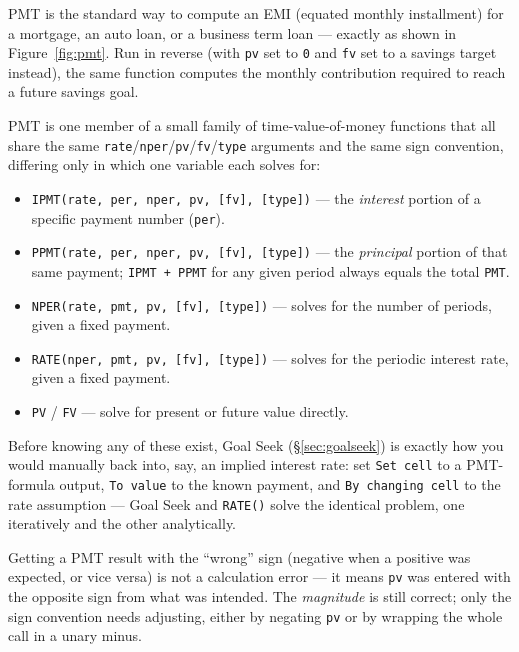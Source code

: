 \documentclass[11pt,a4paper]{article}
\begin{document}
\begin{financeapp}
PMT is the standard way to compute an EMI (equated monthly installment) for a mortgage, an auto loan, or a business term loan --- exactly as shown in Figure~\ref{fig:pmt}. Run in reverse (with \texttt{pv} set to \texttt{0} and \texttt{fv} set to a savings target instead), the same function computes the monthly contribution required to reach a future savings goal.
\end{financeapp}

\begin{protip}
PMT is one member of a small family of time-value-of-money functions that all share the same \texttt{rate}/\texttt{nper}/\texttt{pv}/\texttt{fv}/\texttt{type} arguments and the same sign convention, differing only in which one variable each solves for:
\begin{itemize}
  \item \texttt{IPMT(rate, per, nper, pv, [fv], [type])} --- the \emph{interest} portion of a specific payment number (\texttt{per}).
  \item \texttt{PPMT(rate, per, nper, pv, [fv], [type])} --- the \emph{principal} portion of that same payment; \texttt{IPMT + PPMT} for any given period always equals the total \texttt{PMT}.
  \item \texttt{NPER(rate, pmt, pv, [fv], [type])} --- solves for the number of periods, given a fixed payment.
  \item \texttt{RATE(nper, pmt, pv, [fv], [type])} --- solves for the periodic interest rate, given a fixed payment.
  \item \texttt{PV} / \texttt{FV} --- solve for present or future value directly.
\end{itemize}
Before knowing any of these exist, Goal Seek (\S\ref{sec:goalseek}) is exactly how you would manually back into, say, an implied interest rate: set \texttt{Set cell} to a PMT-formula output, \texttt{To value} to the known payment, and \texttt{By changing cell} to the rate assumption --- Goal Seek and \texttt{RATE()} solve the identical problem, one iteratively and the other analytically.
\end{protip}

\begin{pitfall}
Getting a PMT result with the ``wrong'' sign (negative when a positive was expected, or vice versa) is not a calculation error --- it means \texttt{pv} was entered with the opposite sign from what was intended. The \emph{magnitude} is still correct; only the sign convention needs adjusting, either by negating \texttt{pv} or by wrapping the whole call in a unary minus.
\end{pitfall}
\end{document}
